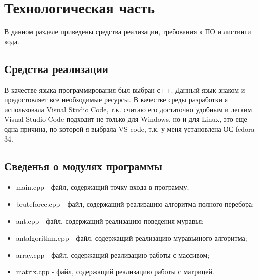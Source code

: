 \documentclass[12pt,a4paper]{report}
\begin{document}
\newpage
\chapter{Технологическая часть} 

В данном разделе приведены средства реализации, требования к ПО и листинги кода.



\section{Средства реализации}
В качестве языка программирования был выбран с++. Данный язык знаком и предостовляет все необходимые ресурсы.
В качестве среды разработки я использовала Visual Studio Code, т.к. считаю его достаточно удобным и легким.
Visual Studio Code подходит не только для  Windows, но и для Linux, это еще одна причина, по которой я выбрала VS code, т.к. у меня установлена ОС  fedora 34.





\section{Сведенья о модулях программы}

\begin{itemize}
	\item main.cpp - файл, содержащий точку входа в программу;
	\item bruteforce.cpp - файл, содержащий реализацию алгоритма полного перебора;
	\item ant.cpp - файл, содержащий реализацию поведения муравья;
	\item antalgorithm.cpp - файл, содержащий реализацию муравьиного алгоритма;
	\item array.cpp - файл, содержащий реализацию работы с массивом;
	\item matrix.cpp - файл, содержащий реализацию работы с матрицей.
\end{itemize}   
	
\end{document}
